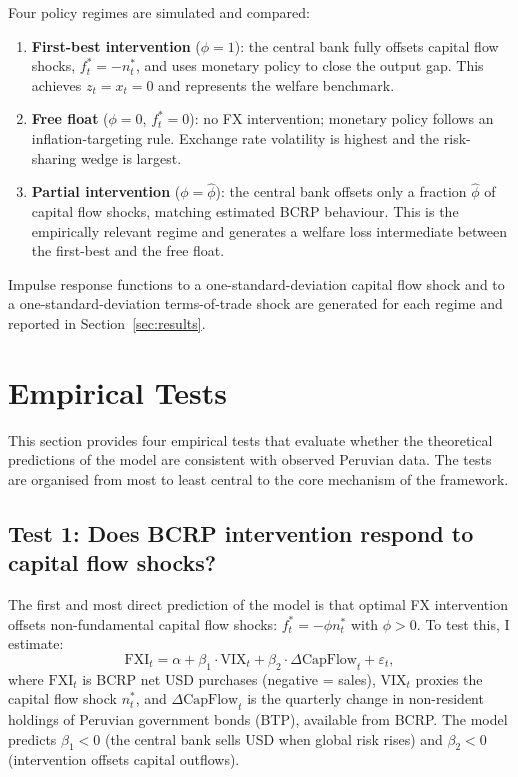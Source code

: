 \documentclass[12pt,a4paper]{article}
\begin{document}
Four policy regimes are simulated and compared:

\begin{enumerate}
    \item \textbf{First-best intervention} ($\phi = 1$): the central bank fully offsets capital flow shocks, $f^*_t = -n^*_t$, and uses monetary policy to close the output gap. This achieves $z_t = x_t = 0$ and represents the welfare benchmark.

    \item \textbf{Free float} ($\phi = 0$, $f^*_t = 0$): no FX intervention; monetary policy follows an inflation-targeting rule. Exchange rate volatility is highest and the risk-sharing wedge is largest.

    \item \textbf{Partial intervention} ($\phi = \hat{\phi}$): the central bank offsets only a fraction $\hat{\phi}$ of capital flow shocks, matching estimated BCRP behaviour. This is the empirically relevant regime and generates a welfare loss intermediate between the first-best and the free float.
\end{enumerate}

Impulse response functions to a one-standard-deviation capital flow shock and to a one-standard-deviation terms-of-trade shock are generated for each regime and reported in Section~\ref{sec:results}.

\section{Empirical Tests}
\label{sec:tests}

This section provides four empirical tests that evaluate whether the theoretical predictions of the model are consistent with observed Peruvian data. The tests are organised from most to least central to the core mechanism of the framework.

\subsection{Test 1: Does BCRP intervention respond to capital flow shocks?}

The first and most direct prediction of the model is that optimal FX intervention offsets non-fundamental capital flow shocks: $f^*_t = -\phi n^*_t$ with $\phi > 0$. To test this, I estimate:
\begin{equation}
    \text{FXI}_t = \alpha + \beta_1 \cdot \text{VIX}_t + \beta_2 \cdot \Delta\text{CapFlow}_t + \varepsilon_t,
    \label{eq:test1}
\end{equation}
where $\text{FXI}_t$ is BCRP net USD purchases (negative = sales), $\text{VIX}_t$ proxies the capital flow shock $n^*_t$, and $\Delta\text{CapFlow}_t$ is the quarterly change in non-resident holdings of Peruvian government bonds (BTP), available from BCRP. The model predicts $\beta_1 < 0$ (the central bank sells USD when global risk rises) and $\beta_2 < 0$ (intervention offsets capital outflows).
\end{document}
